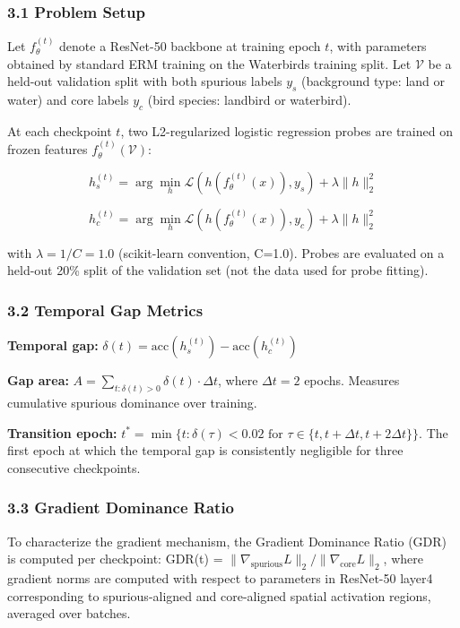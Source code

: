 
\subsubsection{3.1 Problem Setup}

Let $f_{\theta}^{(t)}$ denote a ResNet-50 backbone at training epoch $t$, with parameters obtained by standard ERM training on the Waterbirds training split. Let $\mathcal{V}$ be a held-out validation split with both spurious labels $y_s$ (background type: land or water) and core labels $y_c$ (bird species: landbird or waterbird).

At each checkpoint $t$, two L2-regularized logistic regression probes are trained on frozen features $f_{\theta}^{(t)}(\mathcal{V})$:

$$h_s^{(t)} = \arg\min_h \mathcal{L}(h(f_{\theta}^{(t)}(x)), y_s) + \lambda\|h\|_2^2$$

$$h_c^{(t)} = \arg\min_h \mathcal{L}(h(f_{\theta}^{(t)}(x)), y_c) + \lambda\|h\|_2^2$$

with $\lambda = 1/C = 1.0$ (scikit-learn convention, C=1.0). Probes are evaluated on a held-out 20\% split of the validation set (not the data used for probe fitting).

\subsubsection{3.2 Temporal Gap Metrics}

\textbf{Temporal gap:} $\delta(t) = \text{acc}(h_s^{(t)}) - \text{acc}(h_c^{(t)})$

\textbf{Gap area:} $A = \sum_{t:\delta(t)>0} \delta(t) \cdot \Delta t$, where $\Delta t = 2$ epochs. Measures cumulative spurious dominance over training.

\textbf{Transition epoch:} $t^* = \min\{t : \delta(\tau) < 0.02 \text{ for } \tau \in \{t, t+\Delta t, t+2\Delta t\}\}$. The first epoch at which the temporal gap is consistently negligible for three consecutive checkpoints.

\subsubsection{3.3 Gradient Dominance Ratio}

To characterize the gradient mechanism, the Gradient Dominance Ratio (GDR) is computed per checkpoint: GDR(t) = $\|\nabla_{\text{spurious}} L\|_2 / \|\nabla_{\text{core}} L\|_2$, where gradient norms are computed with respect to parameters in ResNet-50 layer4 corresponding to spurious-aligned and core-aligned spatial activation regions, averaged over batches.


